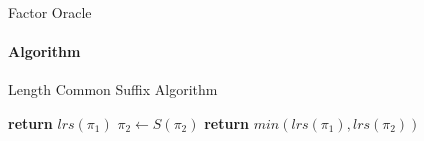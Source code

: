 \begin{frame}[fragile]{Factor Oracle}
  \framesubtitle{Algorithm}
  \begin{algorithm}[H]
    \caption{Length Common Suffix Algorithm}\label{alg:lcs}
    \begin{algorithmic}[1]
      \State \textbf{return} $lrs(\pi_{1})$
      \Else
      \State $\pi_{2} \gets S(\pi_{2})$
      \EndWhile
      \EndIf
      \State \textbf{return} $min(lrs(\pi_{1}),lrs(\pi_{2}))$
      \EndFunction
    \end{algorithmic}
  \end{algorithm}
\end{frame}


